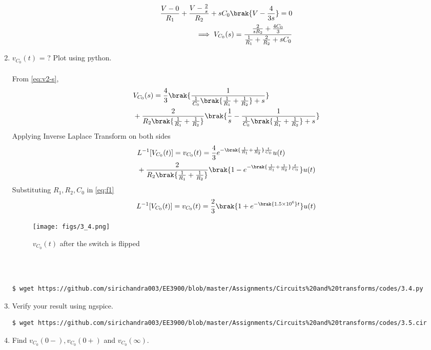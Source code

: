\documentclass[journal,12pt,twocolumn]{IEEEtran}
\renewcommand\thesection{\arabic{section}}
\begin{document}
\begin{enumerate}[label=\arabic*.,ref=\thesection.\theenumi]
\begin{align}
\frac{V - 0}{R_1} + \frac{V - \frac{2}{s}}{R_2} + sC_0\brak{V - \frac{4}{3s}} = 0 \\
\implies V_{C_0}(s) = \frac{\frac{2}{sR_2} + \frac{4C_0}{3}}{\frac{1}{R_1} + \frac{2}{R_2} + sC_0}
\label{eq:v2-s}
\end{align}
\item $v_{C_0}(t)$ = ? Plot using python.
\\
\solution
\\
From \eqref{eq:v2-s},
\begin{align}
&V_{C_0}(s) = \frac{4}{3}\brak{\frac{1}{\frac{1}{C_0}\brak{\frac{1}{R_1} + \frac{1}{R_2}}+s}} \nonumber \\
&+ \frac{2}{R_2\brak{\frac{1}{R_1} +\frac{1}{R_2}}}\brak{\frac{1}{s} - \frac{1}{\frac{1}{C_0}\brak{\frac{1}{R_1} + \frac{1}{R_2}} + s}}
\end{align}
Applying Inverse Laplace Transform on both sides
\begin{align}
&L^{-1}[V_{C_0}(t)]=v_{C_0}(t) = \frac{4}{3}e^{-\brak{\frac{1}{R_1} + \frac{1}{R_2}}\frac{t}{C_0}}u(t) \nonumber \\
&+ \frac{2}{R_2\brak{\frac{1}{R_1}+\frac{1}{R_2}}}\brak{1 - e^{-\brak{\frac{1}{R_1} + \frac{1}{R_2}}\frac{t}{C_0}}}u(t) \label{eq:f1}
\end{align}
Substituting $R_1, R_2, C_0$ in \eqref{eq:f1}
\begin{align}
L^{-1}[V_{C_0}(t)] =v_{C_0}(t)= \frac{2}{3}\brak{1 +e^{-\brak{1.5 \times 10^6}t}}u(t)
\label{eq:v2-t}
\end{align}
\begin{figure}[!htb]
\texttt{[image: figs/3\_4.png]}
\caption{$v_{C_0}(t)$ after the switch is flipped}
\label{fig:v2-t}
\end{figure} \\ \\
\begin{lstlisting}
$ wget https://github.com/sirichandra003/EE3900/blob/master/Assignments/Circuits%20and%20transforms/codes/3.4.py
\end{lstlisting}
\item Verify your result using ngspice. \\
\solution
\begin{lstlisting}
$ wget https://github.com/sirichandra003/EE3900/blob/master/Assignments/Circuits%20and%20transforms/codes/3.5.cir
\end{lstlisting}
\item Find $v_{C_0}(0-), v_{C_0}(0+)$ and  $v_{C_0}(\infty) $. \\

\end{enumerate}
\end{document}
